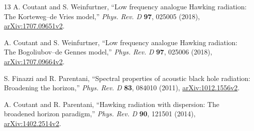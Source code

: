 \documentclass[10pt,a4paper]{article}
\begin{document}
\begin{thebibliography}{13}
A. Coutant and S. Weinfurtner,
``Low frequency analogue Hawking radiation: The Korteweg--de Vries model,''
\emph{Phys. Rev. D} \textbf{97}, 025005 (2018),
\href{https://arxiv.org/abs/1707.09651v2}{arXiv:1707.09651v2}.

A. Coutant and S. Weinfurtner,
``Low frequency analogue Hawking radiation: The Bogoliubov--de Gennes model,''
\emph{Phys. Rev. D} \textbf{97}, 025006 (2018),
\href{https://arxiv.org/abs/1707.09664v2}{arXiv:1707.09664v2}.

S. Finazzi and R. Parentani,
``Spectral properties of acoustic black hole radiation: Broadening the
horizon,'' \emph{Phys. Rev. D} \textbf{83}, 084010 (2011),
\href{https://arxiv.org/abs/1012.1556v2}{arXiv:1012.1556v2}.

A. Coutant and R. Parentani,
``Hawking radiation with dispersion: The broadened horizon paradigm,''
\emph{Phys. Rev. D} \textbf{90}, 121501 (2014),
\href{https://arxiv.org/abs/1402.2514v2}{arXiv:1402.2514v2}.
\end{thebibliography}
\end{document}

